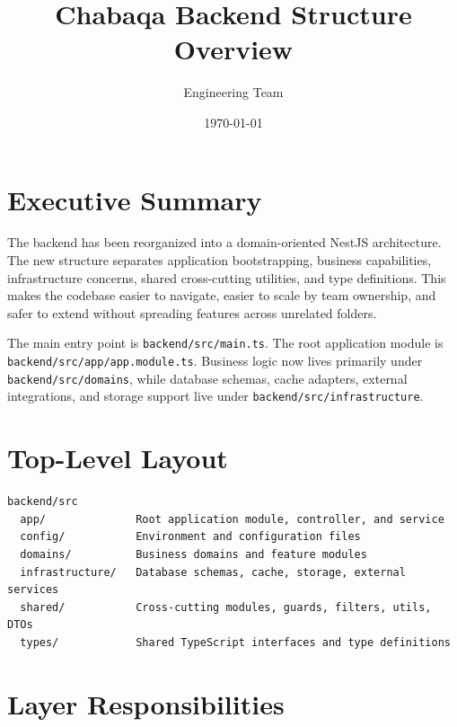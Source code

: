 \documentclass[11pt,a4paper]{article}
\title{\textbf{Chabaqa Backend Structure Overview}}
\author{Engineering Team}
\date{\today}
\begin{document}
\maketitle

\section*{Executive Summary}

The backend has been reorganized into a domain-oriented NestJS architecture. The new structure separates application bootstrapping, business capabilities, infrastructure concerns, shared cross-cutting utilities, and type definitions. This makes the codebase easier to navigate, easier to scale by team ownership, and safer to extend without spreading features across unrelated folders.

The main entry point is \texttt{backend/src/main.ts}. The root application module is \texttt{backend/src/app/app.module.ts}. Business logic now lives primarily under \texttt{backend/src/domains}, while database schemas, cache adapters, external integrations, and storage support live under \texttt{backend/src/infrastructure}.

\section*{Top-Level Layout}

\begin{verbatim}
backend/src
  app/              Root application module, controller, and service
  config/           Environment and configuration files
  domains/          Business domains and feature modules
  infrastructure/   Database schemas, cache, storage, external services
  shared/           Cross-cutting modules, guards, filters, utils, DTOs
  types/            Shared TypeScript interfaces and type definitions
\end{verbatim}

\section*{Layer Responsibilities}
\end{document}
